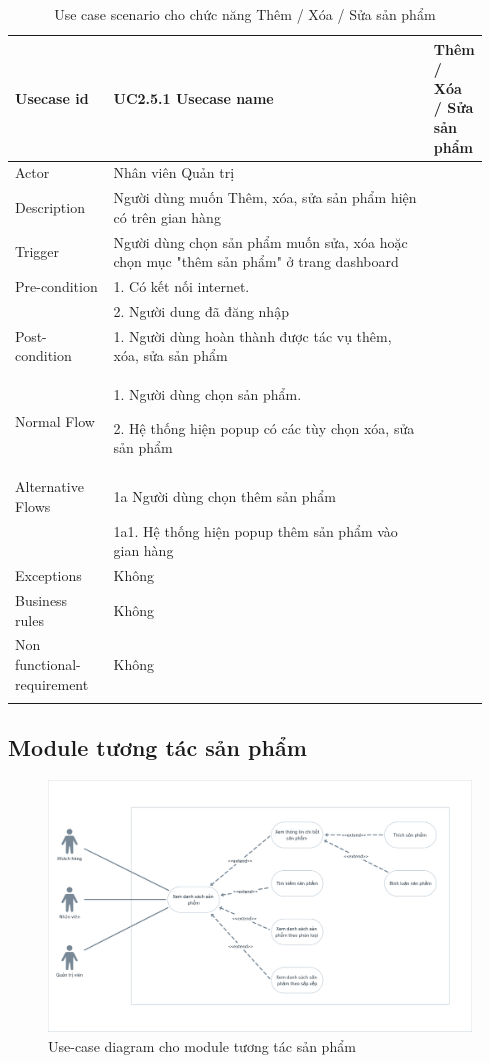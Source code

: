 \begin{longtable}{|>{\hspace{0pt}}m{0.213\linewidth}|>{\hspace{0pt}}m{0.729\linewidth}|} 
\hline
Usecase id & UC2.5.1 \endfirsthead 
\hline
Usecase name & Thêm / Xóa / Sửa sản phẩm \\ 
\hline
Actor & Nhân viên Quản trị \\ 
\hline
Description & Người dùng muốn Thêm, xóa, sửa sản phẩm hiện có trên gian hàng  \\ 
\hline
Trigger & Người dùng chọn sản phẩm muốn sửa, xóa hoặc chọn mục "thêm sản phẩm" ở trang dashboard  \\ 
\hline
Pre-condition & 1. Có kết nối internet. \\
& 2. Người dung đã đăng nhập\\ 
\hline
Post-condition & 1. Người dùng hoàn thành được tác vụ thêm, xóa, sửa sản phẩm \\ 
\hline
Normal Flow & 1. Người dùng chọn sản phẩm.\par{}2. Hệ thống hiện popup có các tùy chọn xóa, sửa sản phẩm \\ 
\hline
Alternative Flows & 1a Người dùng chọn thêm sản phẩm\\
& 1a1. Hệ thống hiện popup thêm sản phẩm vào gian hàng \\
\hline
Exceptions & Không \\ 
\hline
Business rules & Không \\ 
\hline
Non functional-requirement & Không \\ 
\hline
\caption{Use case scenario cho chức năng Thêm / Xóa / Sửa sản phẩm}

\end{longtable}


\newpage
\subsection{Module tương tác sản phẩm}
\begin{figure}[h]
    \centering
    \includegraphics[scale = 0.2]{img/mod/ttsp-mod.png}
    \vspace{0.5cm}
    \caption{Use-case diagram cho module tương tác sản phẩm}
    \label{fig:taskAssignment}
\end{figure}

